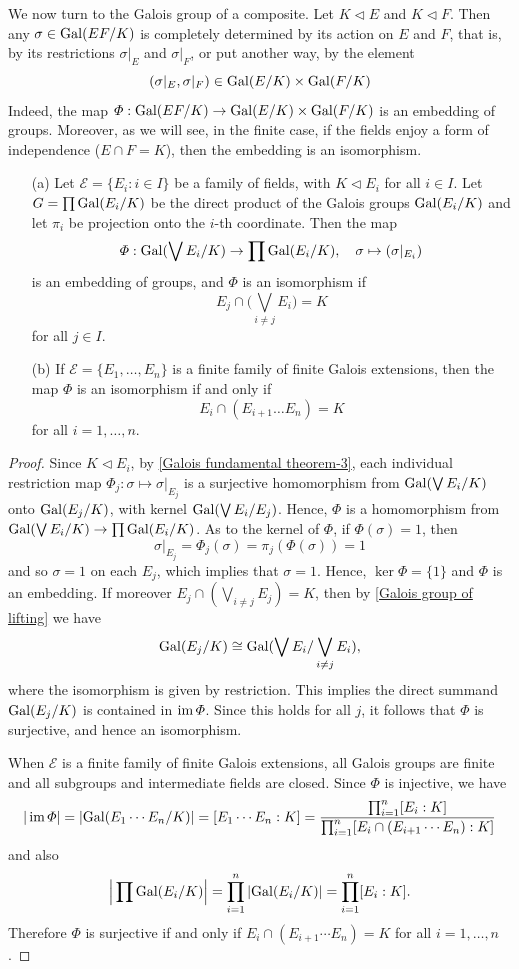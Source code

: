We now turn to the Galois group of a composite. Let $K\lhd E$ and $K\lhd F$. Then any $\sigma\in\mathrm{Gal}(EF/K)$ is completely determined by its action on $E$ and $F$, that is, by its restrictions $\sigma|_E$ and $\sigma|_F$, or put another way, by the element
\[(\sigma|_E,\sigma|_F)\in\mathrm{Gal}(E/K)\times\mathrm{Gal}(F/K)\]
Indeed, the map $\varPhi:\mathrm{Gal}(EF/K)\to\mathrm{Gal}(E/K)\times\mathrm{Gal}(F/K)$ is an embedding of groups. Moreover, as we will see, in the finite case, if the fields enjoy a form of independence ($E\cap F=K$), then the embedding is an isomorphism.
\begin{proposition}\label{Galois group of a composite}
\mbox{}
\begin{itemize}
\item[(a)] Let $\mathcal{E}=\{E_i:i\in I\}$ be a family of fields, with $K\lhd E_i$ for all $i\in I$. Let $G=\prod\mathrm{Gal}(E_i/K)$ be the direct product of the Galois groups $\mathrm{Gal}(E_i/K)$ and let $\pi_i$ be projection onto the $i$-th coordinate. Then the map
\[\varPhi:\mathrm{Gal}(\bigvee E_i/K)\to\prod\mathrm{Gal}(E_i/K),\quad \sigma\mapsto(\sigma|_{E_i})\]
is an embedding of groups, and $\varPhi$ is an isomorphism if
\[E_j\cap\Big(\bigvee_{i\neq j}E_i\Big)=K\]
for all $j\in I$.
\item[(b)] If $\mathcal{E}=\{E_1,\dots,E_n\}$ is a finite family of finite Galois extensions, then the map $\varPhi$ is an isomorphism if and only if
\[E_i\cap(E_{i+1}\dots E_n)=K\]
for all $i=1,\dots,n$.  
\end{itemize}
\end{proposition}
\begin{proof}
Since $K\lhd E_i$, by \cref{Galois fundamental theorem-3}, each individual restriction map $\varPhi_j:\sigma\mapsto\sigma|_{E_j}$ is a surjective homomorphism from $\mathrm{Gal}(\bigvee E_i/K)$ onto $\mathrm{Gal}(E_j/K)$, with kernel $\mathrm{Gal}(\bigvee E_i/E_j)$. Hence, $\varPhi$ is a homomorphism from $\mathrm{Gal}(\bigvee E_i/K)\to\prod\mathrm{Gal}(E_i/K)$. As to the kernel of $\varPhi$, if $\varPhi(\sigma)=1$, then
\[\sigma|_{E_j}=\varPhi_j(\sigma)=\pi_j(\varPhi(\sigma))=1\]
and so $\sigma=1$ on each $E_j$, which implies that $\sigma=1$. Hence, $\ker\varPhi=\{1\}$ and $\varPhi$ is an embedding. If moreover $E_j\cap(\bigvee_{i\neq j}E_j)=K$, then by \cref{Galois group of lifting} we have
\[\mathrm{Gal}(E_j/K)\cong\mathrm{Gal}(\bigvee E_i/\bigvee_{i\neq j}E_i),\]
where the isomorphism is given by restriction. This implies the direct summand $\mathrm{Gal}(E_j/K)$ is contained in $\operatorname{im}\varPhi$. Since this holds for all $j$, it follows that $\varPhi$ is surjective, and hence an isomorphism.\par
When $\mathcal{E}$ is a finite family of finite Galois extensions, all Galois groups are finite and all subgroups and intermediate fields are closed. Since $\varPhi$ is injective, we have
\[|\operatorname{im}\varPhi|=|\mathrm{Gal}(E_1\cdots E_n/K)|=[E_1\cdots E_n:K]=\frac{\prod_{i=1}^{n}[E_i:K]}{\prod_{i=1}^{n}[E_i\cap(E_{i+1}\cdots E_n):K]}\]
and also
\[\Big|\prod\mathrm{Gal}(E_i/K)\Big|=\prod_{i=1}^{n}|\mathrm{Gal}(E_i/K)|=\prod_{i=1}^{n}[E_i:K].\]
Therefore $\varPhi$ is surjective if and only if $E_i\cap(E_{i+1}\cdots E_n)=K$ for all $i=1,\dots,n$.
\end{proof}
